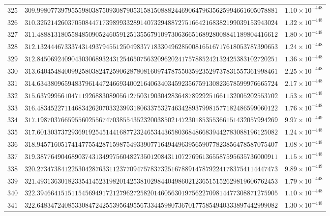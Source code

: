 \documentclass[12pt,reqno]{amsart}
\theoremstyle{remark}
\begin{document}
\begin{longtable}{clc}
$325$ & $309.9980773979555980387509308790531581508882446906479635625994661605078881$ & $1.10\times 10^{-448}$ \\
$326$ & $310.3252142603705084471739899332891407329488727516642168382199039153943024$ & $1.32\times 10^{-448}$ \\
$327$ & $311.4888131805584850905246059125135567910973063665168928008841189804416612$ & $1.80\times 10^{-448}$ \\
$328$ & $312.1324446733374314937945512504983771833049628500816516717618053787390653$ & $1.24\times 10^{-448}$ \\
$329$ & $312.8450692409043030689324312546507563209620241757885242132425383102720251$ & $1.36\times 10^{-448}$ \\
$330$ & $313.6404548400992580382472590628780816097478755035923529737831557361998461$ & $2.25\times 10^{-448}$ \\
$331$ & $314.6343809659483796144724669340021640634034592356759130823678599976665724$ & $2.17\times 10^{-448}$ \\
$332$ & $315.6379995610471192688308905612750319030428364878929251661132005202553702$ & $1.53\times 10^{-448}$ \\
$333$ & $316.4834522711468342620703323993180633753274634289379981577182486599060122$ & $1.76\times 10^{-448}$ \\
$334$ & $317.1987037665955602556747038554352320038502147230185355366151432057994269$ & $9.97\times 10^{-449}$ \\
$335$ & $317.6013037372936919254514416877232465344365803684866839442783088196125082$ & $1.24\times 10^{-448}$ \\
$336$ & $318.9457160517414775542871598754933907716494496395659077823856478587075407$ & $1.08\times 10^{-448}$ \\
$337$ & $319.3877649046890374313499756048273501208431107276961365587595635736000911$ & $1.15\times 10^{-448}$ \\
$338$ & $320.2734738412253042876331123770947578373251678891478792241783754114447473$ & $9.89\times 10^{-449}$ \\
$339$ & $321.4931363018233541452319820142538102984404986021236515152629819606762453$ & $1.79\times 10^{-448}$ \\
$340$ & $322.3946641515115456949172127962725820146056301975622709814477308871275905$ & $1.10\times 10^{-448}$ \\
$341$ & $322.6483472408533084724255395649556733445980736701775854940333897442999082$ & $1.30\times 10^{-448}$ \\

\end{longtable}
\end{document}
